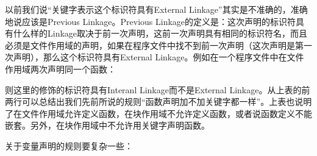 以前我们说“关键字表示这个标识符具有External Linkage”其实是不准确的，准确地说应该是Previous Linkage。Previous Linkage的定义是：这次声明的标识符具有什么样的Linkage取决于前一次声明，这前一次声明具有相同的标识符名，而且必须是文件作用域的声明，如果在程序文件中找不到前一次声明（这次声明是第一次声明），那么这个标识符具有External Linkage。例如在一个程序文件中在文件作用域两次声明同一个函数：




则这里的修饰的标识符具有Interanl Linkage而不是External Linkage。从上表的前两行可以总结出我们先前所说的规则“函数声明加不加关键字都一样”。上表也说明了在文件作用域允许定义函数，在块作用域不允许定义函数，或者说函数定义不能嵌套。另外，在块作用域中不允许用关键字声明函数。



关于变量声明的规则要复杂一些：


